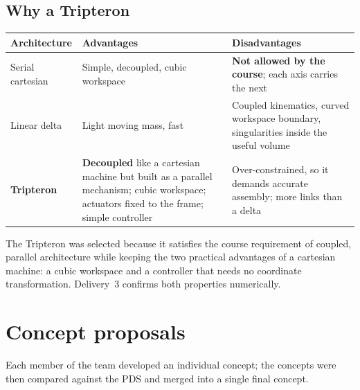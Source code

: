 \documentclass[11pt]{article}
\begin{document}
\subsection{Why a Tripteron}

\begin{center}
\begin{tabular}{@{}l>{\raggedright\arraybackslash}p{5.2cm}>{\raggedright\arraybackslash}p{5.2cm}@{}}
\toprule
\textbf{Architecture} & \textbf{Advantages} & \textbf{Disadvantages} \\
\midrule
Serial cartesian & Simple, decoupled, cubic workspace &
                   \textbf{Not allowed by the course}; each axis carries the next \\
Linear delta     & Light moving mass, fast &
                   Coupled kinematics, curved workspace boundary, singularities inside
                   the useful volume \\
\textbf{Tripteron} & \textbf{Decoupled} like a cartesian machine but built as a parallel
                   mechanism; cubic workspace; actuators fixed to the frame; simple
                   controller &
                   Over-constrained, so it demands accurate assembly; more links than a
                   delta \\
\bottomrule
\end{tabular}
\end{center}

The Tripteron was selected because it satisfies the course requirement of coupled,
parallel architecture while keeping the two practical advantages of a cartesian machine:
a cubic workspace and a controller that needs no coordinate transformation. Delivery~3
confirms both properties numerically.

\section{Concept proposals}

Each member of the team developed an individual concept; the concepts were then compared
against the PDS and merged into a single final concept.
\end{document}

